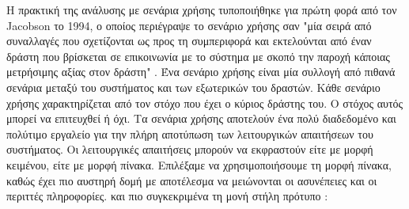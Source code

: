 		Η πρακτική της ανάλυσης με σενάρια χρήσης τυποποιήθηκε για πρώτη φορά από τον Jacobson το 1994, ο οποίος περιέγραψε το σενάριο χρήσης σαν "μία σειρά από συναλλαγές που σχετίζονται ως προς τη συμπεριφορά και εκτελούνται από έναν δράστη που βρίσκεται σε επικοινωνία με το σύστημα με σκοπό την παροχή κάποιας μετρήσιμης αξίας στον δράστη" \cite{Jacobson} . Ένα σενάριο χρήσης είναι μία συλλογή από πιθανά σενάρια μεταξύ του συστήματος και των εξωτερικών του δραστών. Κάθε σενάριο χρήσης χαρακτηρίζεται από τον στόχο που έχει ο κύριος δράστης του. Ο στόχος αυτός μπορεί να επιτευχθεί ή όχι. Τα σενάρια χρήσης αποτελούν ένα πολύ διαδεδομένο και πολύτιμο εργαλείο για την πλήρη αποτύπωση των λειτουργικών απαιτήσεων του συστήματος. Οι λειτουργικές απαιτήσεις μπορούν να εκφραστούν είτε με μορφή κειμένου, είτε με μορφή πίνακα. Επιλέξαμε να χρησιμοποιήσουμε τη μορφή πίνακα, καθώς έχει πιο αυστηρή δομή με αποτέλεσμα να μειώνονται οι ασυνέπειες και οι περιττές πληροφορίες. \cite{Cockburn2000} και πιο συγκεκριμένα τη μονή στήλη πρότυπο \cite{Cockburn2000} :
 
